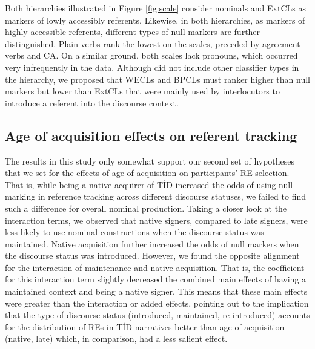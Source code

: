 \documentclass[review]{elsarticle} %
\begin{document}
Both hierarchies illustrated in Figure \ref{fig:scale} consider nominals
and ExtCLs as markers of lowly accessibly referents. Likewise, in both
hierarchies, as markers of highly accessible referents, different types
of null markers are further distinguished. Plain verbs rank the lowest
on the scales, preceded by agreement verbs and CA. On a similar ground,
both scales lack pronouns, which occurred very infrequently in the data.
Although \citet{frederiksen2016} did not include other classifier types
in the hierarchy, we proposed that WECLs and BPCLs must ranker higher
than null markers but lower than ExtCLs that were mainly used by
interlocutors to introduce a referent into the discourse context.

\hypertarget{age-of-acquisition-effects-on-referent-tracking}{%
\subsection{Age of acquisition effects on referent
tracking}\label{age-of-acquisition-effects-on-referent-tracking}}

The results in this study only somewhat support our second set of
hypotheses that we set for the effects of age of acquisition on
participants' RE selection. That is, while being a native acquirer of
TİD increased the odds of using null marking in reference tracking
across different discourse statuses, we failed to find such a difference
for overall nominal production. Taking a closer look at the interaction
terms, we observed that native signers, compared to late signers, were
less likely to use nominal constructions when the discourse status was
maintained. Native acquisition further increased the odds of null
markers when the discourse status was introduced. However, we found the
opposite alignment for the interaction of maintenance and native
acquisition. That is, the coefficient for this interaction term slightly
decreased the combined main effects of having a maintained context and
being a native signer. This means that these main effects were greater
than the interaction or added effects, pointing out to the implication
that the type of discourse status (introduced, maintained,
re-introduced) accounts for the distribution of REs in TİD narratives
better than age of acquisition (native, late) which, in comparison, had
a less salient effect.
\end{document}
